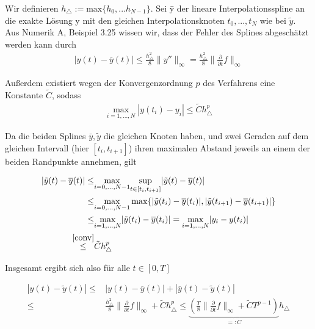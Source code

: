 \begin{solution}
  Wir definieren $h_{\triangle}:=\text{max}\{h_{0},...h_{N-1}\}$.
  Sei \=y der lineare Interpolationsspline an die exakte Lösung y mit den gleichen Interpolationsknoten $t_{0},...,t_{N}$ wie bei $\tilde{y}$.
  Aus Numerik A, Beispiel 3.25 wissen wir, dass der Fehler des Splines abgeschätzt werden kann durch
  \begin{align*}
    |y(t)-\overline{y}(t)| \leq \frac{h_{\triangle}^{2}}{8}\|y''\|_{\infty} = \frac{h_{\triangle}^{2}}{8}\|\frac{\partial}{\partial t} f\|_{\infty}
  \end{align*}

  Außerdem existiert wegen der Konvergenzordnung $p$ des Verfahrens eine Konstante $\tilde{C}$, sodass
  \begin{align}\label{conv}
    \underset{i=1,...,N}{\max} |y(t_{i})-y_{i}| \leq \tilde{C}h_{\triangle}^{p}
  \end{align}

  Da die beiden Splines $\bar{y}, \tilde{y}$ die gleichen Knoten haben, und zwei Geraden auf dem gleichen Intervall (hier $[t_{i},t_{i+1}]$) ihren maximalen Abstand jeweils an einem der beiden Randpunkte annehmen, gilt

  \begin{align*}
    |\tilde{y}(t)-\overline{y}(t)| \leq& \underset{i=0,...,N-1}{\max} \underset{t \in [t_{i},t_{i+1}]}{\sup} |\tilde{y}(t)-\overline{y}(t)| \\
    \leq& \underset{i=0,...,N-1}{\max} \max \{|\tilde{y}(t_{i})-\overline{y}(t_{i})|, |\tilde{y}(t_{i+1})-\overline{y}(t_{i+1})| \} \\
    \leq& \underset{i=1,...,N}{\max}|\tilde{y}(t_{i})-\overline{y}(t_{i})| = \underset{i=1,...,N}{\max}|y_{i}- y(t_{i})| \\
    \stackrel{\eqref{conv}}{\leq}& \tilde{C}h_{\triangle}^{p}
  \end{align*}

  Insgesamt ergibt sich also für alle $t \in [0,T]$

  \begin{align*}
    |y(t)-\tilde{y}(t)| \leq& |y(t)-\overline{y}(t)| + |\overline{y}(t)-\tilde{y}(t)| \\
    \leq& \frac{h_{\triangle}^{2}}{8}\|\frac{\partial}{\partial t} f\|_{\infty} + \tilde{C}h_{\triangle}^{p} \leq \underbrace{(\frac{T}{8}\|\frac{\partial}{\partial t} f\|_{\infty} + \tilde{C}T^{p-1})}_{=:C} h_{\triangle}
  \end{align*}


\end{solution}
